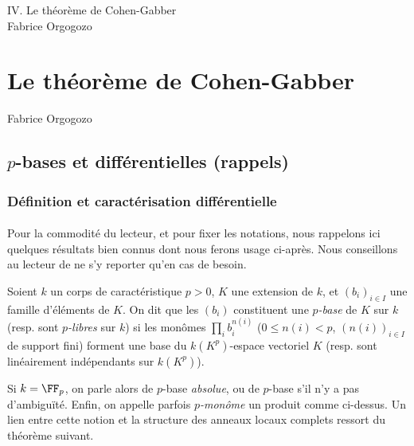 \documentclass[10pt]{../fichiers-configuration-latex/smfart}
\begin{document}
\begin{center}
IV. Le théorème de Cohen-Gabber\\
Fabrice Orgogozo
\end{center}

\version
\tableofcontents

\else
{}
\chapter{Le théorème de Cohen-Gabber}
\begin{center}
Fabrice Orgogozo
\end{center}
\fi

\section{$p$-bases et différentielles (rappels)}

\subsection{Définition et caractérisation différentielle}

\subsubsection{}
Pour la commodité du lecteur, et pour fixer les
notations, nous rappelons ici quelques résultats bien
connus dont nous ferons usage ci-après.
Nous conseillons au lecteur de ne s'y reporter qu'en
cas de besoin.

\begin{définition2}
Soient $k$ un corps de caractéristique $p>0$,
$K$ une extension de $k$, et $(b_i)_{i∈I}$ une famille d'éléments de $K$.
On dit que les $(b_i)$ constituent une
\emph{$p$-base} de $K$ sur $k$ (resp. sont \emph{$p$-libres} sur $k$) 
si les monômes $\prod_i b_i^{n(i)}$ ($0≤n(i)<p$,
$(n(i))_{i∈I}$ de support fini) forment une base
du $k(K^p)$-espace vectoriel $K$ (resp. sont linéairement indépendants
sur $k(K^p)$).
\end{définition2}

Si $k=\FF_p$, on parle alors de $p$-base \emph{absolue},
ou de $p$-base s'il n'y a pas d'ambiguïté.
Enfin, on appelle parfois \emph{$p$-monôme} un produit comme
ci-dessus. Un lien entre cette notion et la structure des anneaux
locaux complets ressort du théorème suivant.
\end{document}
